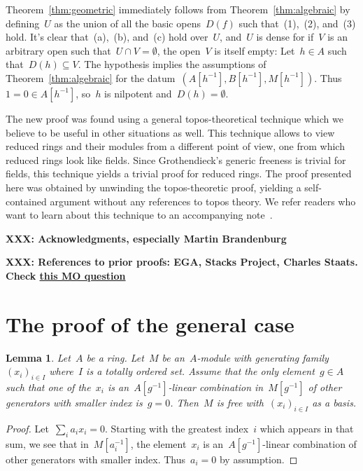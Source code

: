 \documentclass{amsart}
\theoremstyle{definition}
\theoremstyle{plain}
\newtheorem{lemma}[defn]{Lemma}
\theoremstyle{remark}
\newcommand{\XXX}[1]{\textbf{XXX: #1}}
\begin{document}
Theorem~\ref{thm:geometric} immediately follows from
Theorem~\ref{thm:algebraic} by defining~$U$ as the union of all the basic
opens~$D(f)$ such that~(1),~(2), and~(3) hold. It's clear that~(a),~(b),
and~(c) hold over~$U$, and~$U$ is dense for if~$V$ is an arbitrary open
such that~$U \cap V = \emptyset$, the open~$V$ is itself empty: Let~$h \in A$
such that~$D(h) \subseteq V$. The hypothesis implies the assumptions of
Theorem~\ref{thm:algebraic} for the datum~$(A[h^{-1}], B[h^{-1}], M[h^{-1}])$.
Thus~$1 = 0 \in A[h^{-1}]$, so~$h$ is nilpotent and~$D(h) = \emptyset$.

The new proof was found using a general topos-theoretical technique which we
believe to be useful in other situations as well. This technique allows to view
reduced rings and their modules from a different point of view, one from which
reduced rings look like fields. Since Grothendieck's generic freeness
is trivial for fields, this technique yields a trivial proof for reduced rings.
The proof presented here was obtained by unwinding the topos-theoretic proof,
yielding a self-contained argument without any references to topos theory.
We refer readers who want to learn about this technique to an accompanying
note~\cite{blechschmidt:wlog}.

\XXX{Acknowledgments, especially Martin Brandenburg}

\XXX{References to prior proofs: EGA, Stacks Project, Charles Staats. Check
\href{https://math.stackexchange.com/questions/1048496/question-on-generic-freeness-ref-matsumura-page-185}{this
MO question}}


\section{The proof of the general case}

\begin{lemma}\label{lemma:basis}
Let~$A$ be a ring. Let~$M$ be an~$A$-module with generating
family~$(x_i)_{i \in I}$ where~$I$ is a totally ordered set. Assume that the
only element~$g \in A$ such that one of the~$x_i$ is an~$A[g^{-1}]$-linear
combination in~$M[g^{-1}]$ of other generators with smaller index is~$g = 0$.
Then~$M$ is free with~$(x_i)_{i \in I}$ as a basis.
\end{lemma}

\begin{proof}Let~$\sum_i a_i x_i = 0$. Starting with the greatest
index~$i$ which appears in that sum, we see that in~$M[a_i^{-1}]$, the
element~$x_i$ is an~$A[g^{-1}]$-linear combination of other generators with
smaller index. Thus~$a_i = 0$ by assumption.\end{proof}
\end{document}
